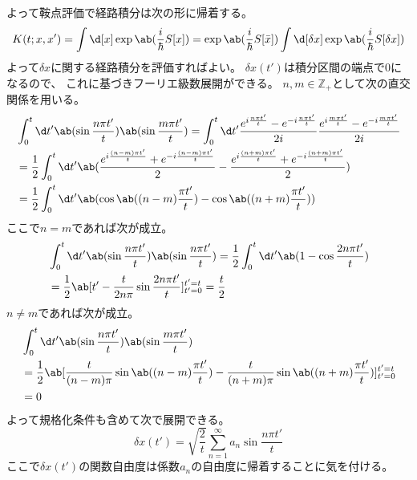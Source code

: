 よって鞍点評価で経路積分は次の形に帰着する。
\begin{equation}
  K(t;x,x')
  =\int\d[x]\exp\ab(\frac{i}{\hbar}S[x])
  =\exp\ab(\frac{i}{\hbar}S[\bar{x}])
  \int\d[\delta x]\exp\ab(\frac{i}{\hbar}S[\delta x])
\end{equation}
よって$\delta x$に関する経路積分を評価すればよい。
$\delta x(t')$は積分区間の端点で0になるので、
これに基づきフーリエ級数展開ができる。
$n,m\in\mathbb{Z}_+$として次の直交関係を用いる。
\begin{equation}
  \begin{split}
    &\int_0^t\d t'\ab(\sin\frac{n\pi t'}{t})\ab(\sin\frac{m\pi t'}{t})
    =\int_0^t\d t'
    \frac{e^{i\frac{n\pi t'}{t}}-e^{-i\frac{n\pi t'}{t}}}{2i}
    \frac{e^{i\frac{m\pi t'}{t}}-e^{-i\frac{m\pi t'}{t}}}{2i} \\
    &=\frac{1}{2}\int_0^t\d t'
    \ab(
    \frac{e^{i\frac{(n-m)\pi t'}{t}}+e^{-i\frac{(n-m)\pi t'}{t}}}{2}
    -\frac{e^{i\frac{(n+m)\pi t'}{t}}+e^{-i\frac{(n+m)\pi t'}{t}}}{2}
    ) \\
    &=\frac{1}{2}\int_0^t\d t'
    \ab(
    \cos\ab((n-m)\frac{\pi t'}{t})
    -\cos\ab((n+m)\frac{\pi t'}{t})
    )
  \end{split}
\end{equation}
ここで$n=m$であれば次が成立。
\begin{equation}
  \begin{split}
    &\int_0^t\d t'\ab(\sin\frac{n\pi t'}{t})\ab(\sin\frac{n\pi t'}{t})
    =\frac{1}{2}\int_0^t\d t'\ab(1-\cos\frac{2n\pi t'}{t}) \\
    &=\frac{1}{2}\ab[t'-\frac{t}{2n\pi}\sin\frac{2n\pi t'}{t}]_{t'=0}^{t'=t}
    =\frac{t}{2}
  \end{split}
\end{equation}
$n\neq m$であれば次が成立。
\begin{equation}
  \begin{split}
    &\int_0^t\d t'\ab(\sin\frac{n\pi t'}{t})\ab(\sin\frac{m\pi t'}{t}) \\
    &=\frac{1}{2}\ab[
      \frac{t}{(n-m)\pi}\sin\ab((n-m)\frac{\pi t'}{t})
      -\frac{t}{(n+m)\pi}\sin\ab((n+m)\frac{\pi t'}{t})
    ]_{t'=0}^{t'=t} \\
    &=0
  \end{split}
\end{equation}
よって規格化条件も含めて次で展開できる。
\begin{equation}
  \delta x(t')
  =\sqrt{\frac{2}{t}}\sum_{n=1}^\infty
  a_n \sin\frac{n\pi t'}{t}
\end{equation}
ここで$\delta x(t')$の関数自由度は係数$a_n$の自由度に帰着することに気を付ける。

